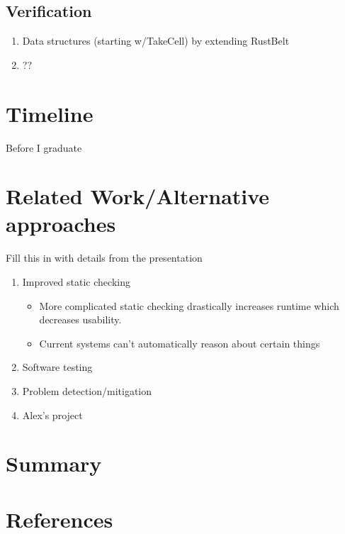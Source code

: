 \documentclass{article}
\begin{document}
\subsection{Verification}
\begin{enumerate}
    \item Data structures (starting w/TakeCell) by extending RustBelt
    \item ??
\end{enumerate}

\section{Timeline}
Before I graduate

\section{Related Work/Alternative approaches}
Fill this in with details from the presentation
\begin{enumerate}
    \item Improved static checking
    \begin{itemize}
        \item More complicated static checking drastically increases runtime which decreases usability.
        \item Current systems can't automatically reason about certain things
    \end{itemize}
    
    \item Software testing
    
    \item Problem detection/mitigation
    
    \item Alex's project
    
\end{enumerate}

\section{Summary}

\section{References}
\end{document}
